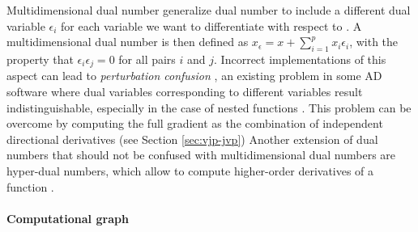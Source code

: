 Multidimensional dual number generalize dual number to include a different dual variable $\epsilon_i$ for each variable we want to differentiate with respect to \cite{Neuenhofen_2018, RevelsLubinPapamarkou2016}.
A multidimensional dual number is then defined as $x_\epsilon = x + \sum_{i=1}^p x_i \epsilon_i$, with the property that $\epsilon_i \epsilon_j = 0$ for all pairs $i$ and $j$.
Incorrect implementations of this aspect can lead to \textit{perturbation confusion} \cite{siskind2005perturbation, manzyuk2019perturbation}, an existing problem in some AD software where dual variables corresponding to different variables result indistinguishable, especially in the case of nested functions \cite{manzyuk2019perturbation}. 
This problem can be overcome by computing the full gradient as the combination of independent directional derivatives (see Section \ref{sec:vjp-jvp}) 
Another extension of dual numbers that should not be confused with multidimensional dual numbers are hyper-dual numbers, which allow to compute higher-order derivatives of a function \cite{fike2013multi}. 

\paragraph{Computational graph}


